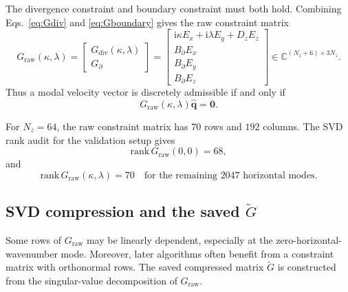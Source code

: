 \documentclass[11pt]{article}
\newcommand{\ii}{\mathrm{i}}
\newcommand{\bfq}{\bm{q}}
\newcommand{\bfzero}{\bm{0}}
\newcommand{\Graw}{G_{\mathrm{raw}}}
\newcommand{\Gdiv}{G_{\mathrm{div}}}
\newcommand{\Gbdry}{G_{\partial}}
\newcommand{\Gtilde}{\widetilde{G}}
\newcommand{\Ez}{E_z}
\newcommand{\Ex}{E_x}
\newcommand{\Ey}{E_y}
\newcommand{\Dz}{D_z}
\newcommand{\Bbdry}{B_{\partial}}
\begin{document}
The divergence constraint and boundary constraint must both hold. Combining
Eqs.~\eqref{eq:Gdiv} and \eqref{eq:Gboundary} gives the raw constraint matrix
\begin{equation}
  \Graw(\kappa,\lambda)
  =
  \begin{bmatrix}
    \Gdiv(\kappa,\lambda)\\
    \Gbdry
  \end{bmatrix}
  =
  \begin{bmatrix}
    \ii\kappa\Ex+\ii\lambda\Ey+\Dz\Ez\\
    \Bbdry\Ex\\
    \Bbdry\Ey\\
    \Bbdry\Ez
  \end{bmatrix}
  \in\mathbb{C}^{(N_z+6)\times 3N_z}.
  \label{eq:Graw}
\end{equation}
Thus a modal velocity vector is discretely admissible if and only if
\begin{equation}
  \Graw(\kappa,\lambda)\widehat{\bfq}=\bfzero.
  \label{eq:raw_constraint_equation}
\end{equation}

For \(N_z=64\), the raw constraint matrix has \(70\) rows and \(192\) columns.
The SVD rank audit for the validation setup gives
\[
  \mathrm{rank}\,\Graw(0,0)=68,
\]
and
\[
  \mathrm{rank}\,\Graw(\kappa,\lambda)=70
  \quad\text{for the remaining }2047\text{ horizontal modes}.
\]

\subsection{SVD compression and the saved \texorpdfstring{\(\Gtilde\)}{Gtilde}}

Some rows of \(\Graw\) may be linearly dependent, especially at the
zero-horizontal-wavenumber mode. Moreover, later algorithms often benefit from
a constraint matrix with orthonormal rows. The saved compressed matrix
\(\Gtilde\) is constructed from the singular-value decomposition of
\(\Graw\).
\end{document}
